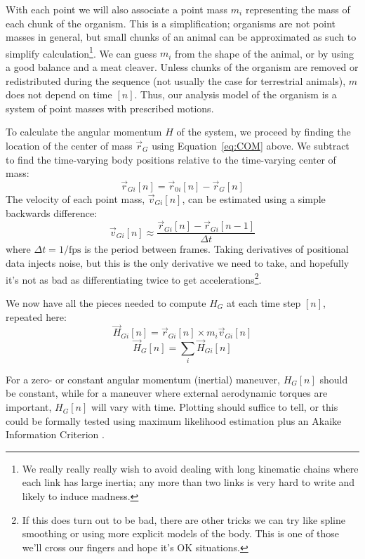 \documentclass{amsart}
\begin{document}
With each point we will also associate a point mass $m_i$ representing the mass of each chunk of the organism. This is a simplification; organisms are not point masses in general, but small chunks of an animal can be approximated as such to simplify calculation\footnote{We really really really wish to avoid dealing with long kinematic chains where each link has large inertia; any more than two links is very hard to write and likely to induce madness.}. We can guess $m_i$ from the shape of the animal, or by using a good balance and a meat cleaver. Unless chunks of the organism are removed or redistributed during the sequence (not usually the case for terrestrial animals), $m$ does not depend on time $[n]$. Thus, our analysis model of the organism is a system of point masses with prescribed motions.  

To calculate the angular momentum $H$ of the system, we proceed by finding the location of the center of mass $\vec{r}_G$ using Equation~\ref{eq:COM} above. We subtract to find the time-varying body positions relative to the time-varying center of mass:
\begin{equation}
\vec{r}_{Gi}[n] = \vec{r}_{0i}[n]-\vec{r}_{G}[n]
\label{eq:rg}
\end{equation}
The velocity of each point mass, $\vec{v}_{Gi}[n]$, can be estimated using a simple backwards difference:
\begin{equation}
\vec{v}_{Gi}[n] \approx \frac{\vec{r}_{Gi}[n] - \vec{r}_{Gi}[n-1]}{\Delta t}
\end{equation}
where $\Delta t = 1/\mbox{fps}$ is the period between frames. Taking derivatives of positional data injects noise, but this is the only derivative we need to take, and hopefully it's not as bad as differentiating twice to get accelerations\footnote{If this does turn out to be bad, there are other tricks we can try like spline smoothing or using more explicit models of the body. This is one of those we'll cross our fingers and hope it's OK situations.}. 

We now have all the pieces needed to compute $H_G$ at each time step $[n]$, repeated here: 
\begin{equation}
\vec{H}_{Gi}[n] = \vec{r}_{Gi}[n] \times m_i \vec{v}_{Gi}[n]
\end{equation}
\begin{equation}
\vec{H}_{G}[n] = \sum_i \vec{H}_{Gi}[n]
\end{equation}

For a zero- or constant angular momentum (inertial) maneuver, $H_G[n]$ should be constant, while for a maneuver where external aerodynamic torques are important, $H_G[n]$ will vary with time. Plotting should suffice to tell, or this could be formally tested using maximum likelihood estimation plus an Akaike Information Criterion \cite{notes:tdd}. 
\end{document}
